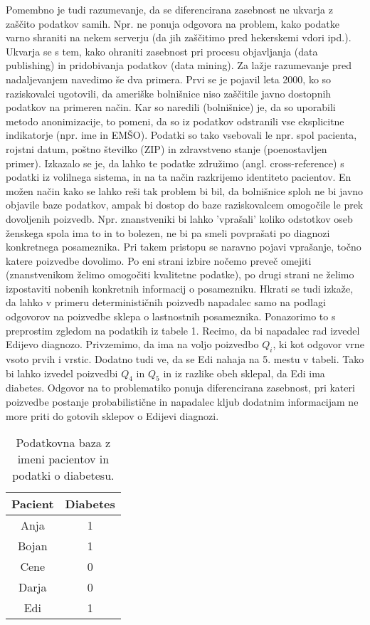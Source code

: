 \documentclass[mat1]{article}
\theoremstyle{definition}
\begin{document}
Pomembno je tudi razumevanje, da se diferencirana zasebnost ne ukvarja z zaščito podatkov samih. Npr. ne ponuja odgovora na problem, kako podatke varno shraniti na nekem serverju (da jih zaščitimo pred hekerskemi vdori ipd.). Ukvarja se s tem, kako ohraniti zasebnost pri procesu objavljanja (data publishing) in pridobivanja podatkov (data mining). Za lažje razumevanje pred nadaljevanjem navedimo še dva primera. Prvi se je pojavil leta 2000, ko so raziskovalci ugotovili, da ameriške bolnišnice niso zaščitile javno dostopnih podatkov na primeren način. Kar so naredili (bolnišnice) je, da so uporabili metodo anonimizacije, to pomeni, da so iz podatkov odstranili vse eksplicitne indikatorje (npr. ime in EMŠO). Podatki so tako vsebovali le npr. spol pacienta, rojstni datum, poštno številko (ZIP) in zdravstveno stanje (poenostavljen primer). Izkazalo se je, da lahko te podatke združimo (angl. cross-reference) s podatki iz volilnega sistema, in na ta način razkrijemo identiteto pacientov. En možen način kako se lahko reši tak problem bi bil, da bolnišnice sploh ne bi javno objavile baze podatkov, ampak bi dostop do baze raziskovalcem omogočile le prek dovoljenih poizvedb. Npr. znanstveniki bi lahko 'vprašali' koliko odstotkov oseb ženskega spola ima to in to bolezen, ne bi pa smeli povprašati po diagnozi konkretnega posameznika. Pri takem pristopu se naravno pojavi vprašanje, točno katere poizvedbe dovolimo. Po eni strani izbire nočemo preveč omejiti (znanstvenikom želimo omogočiti kvalitetne podatke), po drugi strani ne želimo izpostaviti nobenih konkretnih informacij o posamezniku. Hkrati se tudi izkaže, da lahko v primeru determinističnih poizvedb napadalec samo na podlagi odgovorov na poizvedbe sklepa o lastnostnih posameznika. Ponazorimo to s preprostim zgledom na podatkih iz tabele 1. Recimo, da bi napadalec rad izvedel Edijevo diagnozo. Privzemimo, da ima na voljo poizvedbo $Q_i$, ki kot odgovor vrne vsoto prvih i vrstic. Dodatno tudi ve, da se Edi nahaja na 5. mestu v tabeli. Tako bi lahko izvedel poizvedbi $Q_4$ in $Q_5$ in iz razlike obeh sklepal, da Edi ima diabetes.  Odgovor na to problematiko ponuja diferencirana zasebnost, pri kateri poizvedbe postanje probabilistične in napadalec kljub dodatnim informacijam ne more priti do gotovih sklepov o Edijevi diagnozi.
\begin{table}
\begin{center}
 \begin{tabular}{| c | c |} 
 \hline
 \textbf{Pacient} & \textbf{Diabetes}  \\ [0.5ex] 
 \hline
 Anja & 1  \\ 
 \hline
 Bojan & 1\\
 \hline
 Cene & 0 \\
 \hline
 Darja & 0  \\
 \hline
 Edi & 1  \\  
 \hline
\end{tabular}
\caption{Podatkovna baza z imeni pacientov in podatki o diabetesu.}
\end{center}
\end{table}
\end{document}
